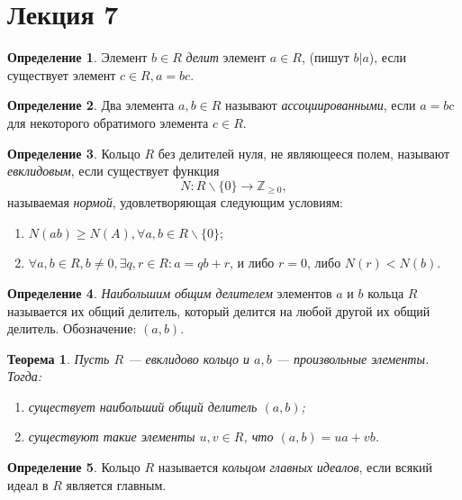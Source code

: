 \documentclass[a4paper]{article}
\theoremstyle{plain}
\newtheorem*{theorem}{Теорема}
\theoremstyle{definition}
\newtheorem{definition}{Определение}
\numberwithin{definition}{section}
\numberwithin{proposal}{section}
\begin{document}
\section{Лекция 7}

\begin{definition}
Элемент \(b \in R\) \emph{делит} элемент \(a \in R\), (пишут \(b | a\)), если существует элемент \(c \in R, a = bc\).
\end{definition}

\begin{definition}
Два элемента \(a, b \in R\) называют \emph{ассоциированными}, если \(a = bc\) для некоторого обратимого элемента \(c \in R\). 
\end{definition}

\begin{definition}
Кольцо \(R\) без делителей нуля, не являющееся полем, называют \emph{евклидовым}, если существует функция
\begin{equation*}
	N : R \backslash \{0\} \rightarrow \mathbb{Z}_{\geqslant 0},
\end{equation*}
называемая \emph{нормой}, удовлетворяющая следующим условиям:
\begin{enumerate}
	\item \(N(ab) \geqslant N(A), \forall a, b \in R \backslash \{0\}\);
	\item \(\forall a, b \in R, b \neq 0, \exists q, r \in R: a = qb + r\), и либо \(r = 0\), либо \(N(r) < N(b)\).
\end{enumerate}
\end{definition}

\begin{definition}
\emph{Наибольшим общим делителем} элементов \(a\) и \(b\) кольца \(R\) называется их общий делитель, который делится на любой другой их общий делитель. Обозначение: \((a, b)\).
\end{definition}

\begin{theorem}
Пусть \(R\) --- евклидово кольцо и \(a, b\) --- произвольные элементы. Тогда:
\begin{enumerate}
	\item существует наибольший общий делитель \((a, b)\);
	\item существуют такие элементы \(u, v \in R\), что \((a, b) = ua + vb\).
\end{enumerate}
\end{theorem}

\begin{definition}
Кольцо \(R\) называется \emph{кольцом главных идеалов}, если всякий идеал в \(R\) является главным.
\end{definition}
\end{document}

